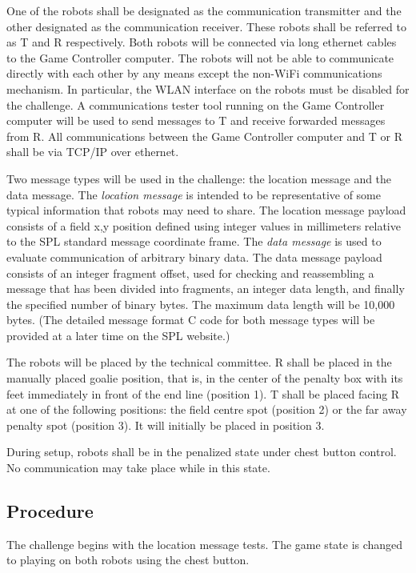 \documentclass[12pt]{article}
\begin{document}
One of the robots shall be designated as
the communication transmitter and the other designated as the communication receiver. 
These robots shall be referred to as T and R respectively.
Both robots will be connected via long ethernet cables to the Game Controller computer.
The robots will not be able to communicate directly with each other by any means except the non-WiFi communications mechanism. In particular, the WLAN interface on the robots must be disabled for the challenge.
A communications tester tool running on the Game Controller computer will be used to send messages to T and receive forwarded messages from R. 
All communications between the Game Controller computer and T or R shall be via TCP/IP over ethernet.

Two message types will be used in the challenge: the location message and the data message. The {\em location message} is intended to be representative of some typical information that robots may need to share. The location message  payload consists of a field x,y position defined using integer values in millimeters relative to the SPL standard message coordinate frame.
The {\em data message} is used to evaluate communication of arbitrary binary data. The data message payload consists of an integer fragment offset, used for checking and reassembling a message that has been divided into fragments, an integer data length, and finally the specified number of binary bytes. The maximum data length will be 10,000 bytes. (The detailed message format C code for both message types will be provided at a later time on the SPL website.)

The robots will be placed by the technical committee. 
R shall be placed in the manually placed goalie
position, that is, in the center of the penalty box with its feet immediately in front of the end line (position 1).
T shall be placed facing R at one of the following positions: the field centre spot (position 2) or the far away penalty spot (position 3). It will initially be placed in position 3.

During setup, robots shall be in the penalized state under chest button control. No communication may take place while in this state.

\subsection{Procedure}
The challenge begins with the location message tests. The game state is changed to playing on both robots using the chest button.
\end{document}
